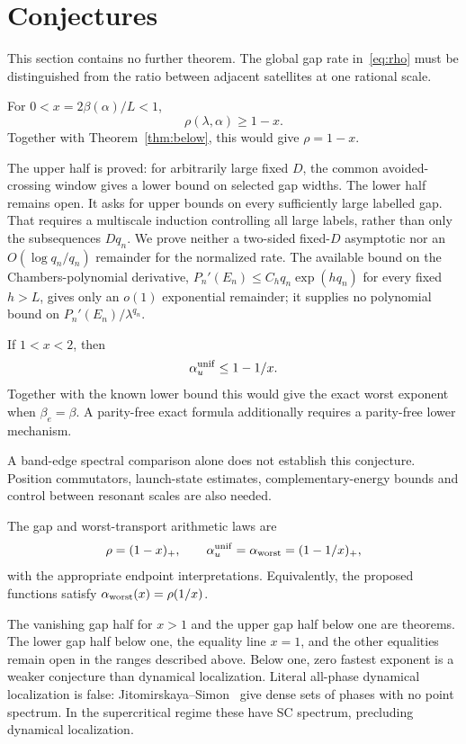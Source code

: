 \section{Conjectures}\label{sec:conjectures}
This section contains no further theorem. The global gap rate in~\eqref{eq:rho} must be distinguished from the ratio between adjacent satellites at one rational scale.


\begin{conjecture}\label{conj:gap}
For $0<x=2\beta(\alpha)/L<1$,
\[
 \rho(\lambda,\alpha)\ge1-x.
\]
Together with Theorem~\ref{thm:below}, this would give $\rho=1-x$.
\end{conjecture}
The upper half is proved: for arbitrarily large fixed $D$, the common avoided-crossing window gives a lower bound on selected gap widths. The lower half remains open. It asks for upper bounds on every sufficiently large labelled gap. That requires a multiscale induction controlling all large labels, rather than only the subsequences $Dq_n$. We prove neither a two-sided fixed-$D$ asymptotic nor an $O(\log q_n/q_n)$ remainder for the normalized rate. The available bound on the Chambers-polynomial derivative,
$P_n'(E_n)\le C_hq_n\exp(hq_n)$ for every fixed $h>L$,
gives only an $o(1)$ exponential remainder; it supplies no polynomial bound on
$P_n'(E_n)/\lambda^{q_n}$.

\begin{conjecture}\label{conj:transport}
If $1<x<2$, then
\[
 \alpha_u^{\rm unif}\le1-1/x.
\]
Together with the known lower bound this would give the exact worst exponent when $\beta_e=\beta$. A parity-free exact formula additionally requires a parity-free lower mechanism.
\end{conjecture}
A band-edge spectral comparison alone does not establish this conjecture. Position commutators, launch-state estimates, complementary-energy bounds and control between resonant scales are also needed.

\begin{conjecture}[Complementarity]\label{conj:complementarity}
The gap and worst-transport arithmetic laws are
\[
 \rho=(1-x)_+,\qquad
 \alpha_u^{\rm unif}=\alpha_{\rm worst}=(1-1/x)_+,
\]
with the appropriate endpoint interpretations. Equivalently, the proposed functions satisfy $\alpha_{\rm worst}(x)=\rho(1/x)$.
\end{conjecture}
The vanishing gap half for $x>1$ and the upper gap half below one are theorems. The lower gap half below one, the equality line $x=1$, and the other equalities remain open in the ranges described above. Below one, zero fastest exponent is a weaker conjecture than dynamical localization. Literal all-phase dynamical localization is false: Jitomirskaya--Simon~\cite{JSimon} give dense sets of phases with no point spectrum. In the supercritical regime these have SC spectrum, precluding dynamical localization.

